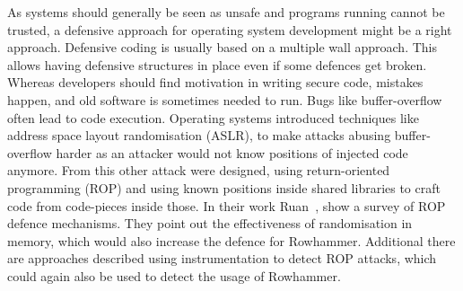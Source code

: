 As systems should generally be seen as unsafe and programs running cannot be
trusted, a defensive approach for operating system development might be a right
approach. Defensive coding is usually based on a multiple wall approach. This
allows having defensive structures in place even if some defences get broken.
Whereas developers should find motivation in writing secure code, mistakes
happen, and old software is sometimes needed to run. Bugs like buffer-overflow
often lead to code execution. Operating systems introduced techniques like
address space layout randomisation (ASLR), to make attacks abusing
buffer-overflow harder as an attacker would not know positions of injected code
anymore. From this other attack were designed, using return-oriented programming
(ROP) and using known positions inside shared libraries to craft code from
code-pieces inside those. In their work Ruan~\etal\cite{ropsur}, show a survey
of ROP defence mechanisms. They point out the effectiveness of randomisation in
memory, which would also increase the defence for Rowhammer. Additional there
are approaches described using instrumentation to detect ROP attacks, which
could again also be used to detect the usage of Rowhammer.

